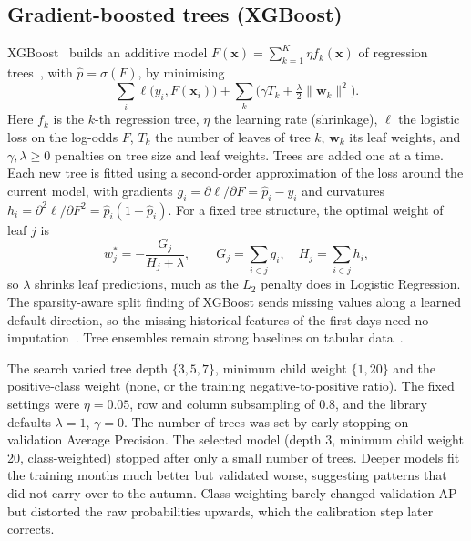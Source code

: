 \documentclass[conference]{IEEEtran}
\begin{document}
\subsection{Gradient-boosted trees (XGBoost)}
XGBoost~\cite{chen2016} builds an additive model $F(\mathbf{x}) = \sum_{k=1}^{K} \eta f_k(\mathbf{x})$
of regression trees~\cite{friedman2001}, with $\hat{p} = \sigma(F)$, by minimising
\begin{equation}
\sum_{i}\ell\big(y_i, F(\mathbf{x}_i)\big) + \sum_{k}\Big(\gamma T_k + \tfrac{\lambda}{2}\lVert\mathbf{w}_k\rVert^2\Big).
\end{equation}
Here $f_k$ is the $k$-th regression tree, $\eta$ the learning rate (shrinkage), $\ell$ the
logistic loss on the log-odds $F$, $T_k$ the number of leaves of tree $k$, $\mathbf{w}_k$ its leaf
weights, and $\gamma,\lambda\geq 0$ penalties on tree size and leaf weights. Trees are added one at
a time. Each new tree is fitted using a second-order approximation of the loss around the current
model, with gradients $g_i=\partial\ell/\partial F=\hat{p}_i-y_i$ and curvatures
$h_i=\partial^2\ell/\partial F^2=\hat{p}_i(1-\hat{p}_i)$. For a fixed tree structure, the optimal
weight of leaf $j$ is
\begin{equation}
w_j^{*} = -\frac{G_j}{H_j + \lambda}, \qquad G_j = \sum_{i \in j} g_i,\quad H_j = \sum_{i \in j} h_i ,
\end{equation}
so $\lambda$ shrinks leaf predictions, much as the $L_2$ penalty does in Logistic Regression. The
sparsity-aware split finding of XGBoost sends missing values along a learned default direction,
so the missing historical features of the first days need no imputation~\cite{chen2016}.
Tree ensembles remain strong baselines on tabular data~\cite{grinsztajn2022}.

The search varied tree depth $\{3,5,7\}$, minimum child weight $\{1,20\}$ and the positive-class
weight (none, or the training negative-to-positive ratio). The fixed settings were $\eta=0.05$,
row and column subsampling of 0.8, and the library defaults $\lambda=1$, $\gamma=0$. The number of
trees was set by early stopping on validation Average Precision. The selected model (depth 3,
minimum child weight 20, class-weighted) stopped after only a small number of trees. Deeper models
fit the training months much better but validated worse, suggesting patterns that did not carry
over to the autumn. Class weighting barely changed validation AP but distorted the raw
probabilities upwards, which the calibration step later corrects.
\end{document}
